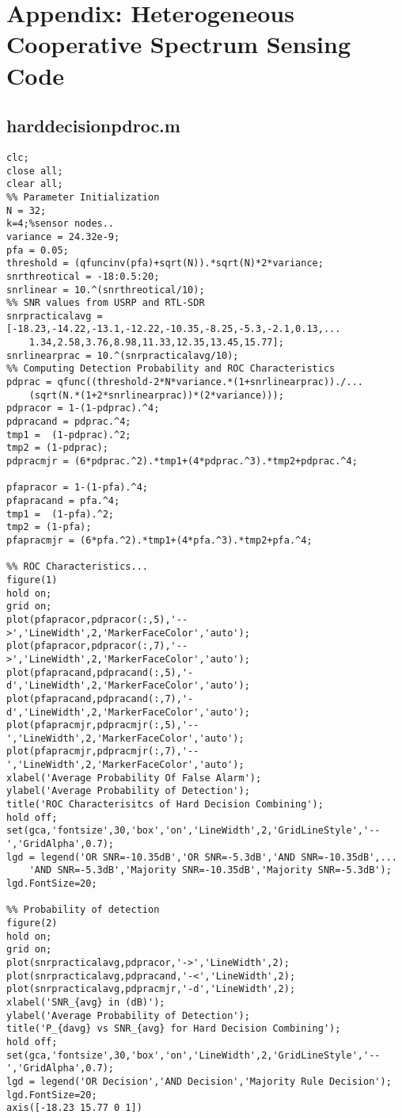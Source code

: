 \chapter{Appendix: Heterogeneous Cooperative Spectrum Sensing Code}
\section{harddecisionpdroc.m}
\begin{lstlisting}[breaklines]
% Hard-Decision Combining Results For Sensor Nodes
clc;
close all;
clear all;
%% Parameter Initialization
N = 32;
k=4;%sensor nodes..
variance = 24.32e-9;
pfa = 0.05;
threshold = (qfuncinv(pfa)+sqrt(N)).*sqrt(N)*2*variance;
snrthreotical = -18:0.5:20;
snrlinear = 10.^(snrthreotical/10);
%% SNR values from USRP and RTL-SDR
snrpracticalavg = [-18.23,-14.22,-13.1,-12.22,-10.35,-8.25,-5.3,-2.1,0.13,...
    1.34,2.58,3.76,8.98,11.33,12.35,13.45,15.77];
snrlinearprac = 10.^(snrpracticalavg/10);
%% Computing Detection Probability and ROC Characteristics
pdprac = qfunc((threshold-2*N*variance.*(1+snrlinearprac))./...
    (sqrt(N.*(1+2*snrlinearprac))*(2*variance)));
pdpracor = 1-(1-pdprac).^4;
pdpracand = pdprac.^4;
tmp1 =  (1-pdprac).^2;
tmp2 = (1-pdprac);
pdpracmjr = (6*pdprac.^2).*tmp1+(4*pdprac.^3).*tmp2+pdprac.^4;

pfapracor = 1-(1-pfa).^4;
pfapracand = pfa.^4;
tmp1 =  (1-pfa).^2;
tmp2 = (1-pfa);
pfapracmjr = (6*pfa.^2).*tmp1+(4*pfa.^3).*tmp2+pfa.^4;

%% ROC Characteristics...
figure(1)
hold on;
grid on;
plot(pfapracor,pdpracor(:,5),'-->','LineWidth',2,'MarkerFaceColor','auto');
plot(pfapracor,pdpracor(:,7),'-->','LineWidth',2,'MarkerFaceColor','auto');
plot(pfapracand,pdpracand(:,5),'-d','LineWidth',2,'MarkerFaceColor','auto');
plot(pfapracand,pdpracand(:,7),'-d','LineWidth',2,'MarkerFaceColor','auto');
plot(pfapracmjr,pdpracmjr(:,5),'--','LineWidth',2,'MarkerFaceColor','auto');
plot(pfapracmjr,pdpracmjr(:,7),'--','LineWidth',2,'MarkerFaceColor','auto');
xlabel('Average Probability Of False Alarm');
ylabel('Average Probability of Detection');
title('ROC Characterisitcs of Hard Decision Combining');
hold off;
set(gca,'fontsize',30,'box','on','LineWidth',2,'GridLineStyle','--','GridAlpha',0.7);
lgd = legend('OR SNR=-10.35dB','OR SNR=-5.3dB','AND SNR=-10.35dB',...
    'AND SNR=-5.3dB','Majority SNR=-10.35dB','Majority SNR=-5.3dB');
lgd.FontSize=20;

%% Probability of detection
figure(2)
hold on;
grid on;
plot(snrpracticalavg,pdpracor,'->','LineWidth',2);
plot(snrpracticalavg,pdpracand,'-<','LineWidth',2);
plot(snrpracticalavg,pdpracmjr,'-d','LineWidth',2);
xlabel('SNR_{avg} in (dB)');
ylabel('Average Probability of Detection');
title('P_{davg} vs SNR_{avg} for Hard Decision Combining');
hold off;
set(gca,'fontsize',30,'box','on','LineWidth',2,'GridLineStyle','--','GridAlpha',0.7);
lgd = legend('OR Decision','AND Decision','Majority Rule Decision');
lgd.FontSize=20;
axis([-18.23 15.77 0 1])
\end{lstlisting}


